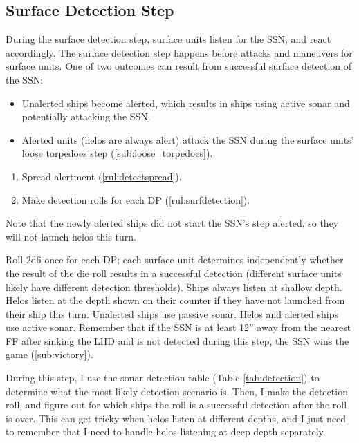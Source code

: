 \documentclass[../TacSubMicroRules.tex]{subfiles}
\begin{document}
\subsection{Surface Detection Step}%
\label{sub:surface_detection_step}

During the surface detection step, surface units listen for the SSN, and react accordingly.
The surface detection step happens before attacks and maneuvers for surface units.
One of two outcomes can result from successful surface detection of the SSN:
\begin{itemize}
    \item Unalerted ships become alerted, which results in ships using active sonar and potentially attacking the SSN.
    \item Alerted units (helos are always alert) attack the SSN during the surface units' loose torpedoes step (\ref{sub:loose_torpedoes}).
\end{itemize}
\begin{enumerate}
    \item Spread alertment (\ref{rul:detectspread}).
    \item Make detection rolls for each DP (\ref{rul:surfdetection}).
\end{enumerate}

 
Note that the newly alerted ships did not start the SSN's step alerted, so they will not launch helos this turn.

 
Roll 2d6 once for each DP; each surface unit determines independently whether the result of the die roll results in a successful detection (different surface units likely have different detection thresholds).
Ships always listen at shallow depth.
Helos listen at the depth shown on their counter if they have not launched from their ship this turn.
Unalerted ships use passive sonar.
Helos and alerted ships use active sonar.
Remember that if the SSN is at least 12'' away from the nearest FF after sinking the LHD and is not detected during this step, the SSN wins the game (\ref{sub:victory}).

\begin{design}
    During this step, I use the sonar detection table (Table \ref{tab:detection}) to determine what the most likely detection scenario is.
    Then, I make the detection roll, and figure out for which ships the roll is a successful detection after the roll is over.
    This can get tricky when helos listen at different depths, and I just need to remember that I need to handle helos listening at deep depth separately.
\end{design}
\end{document}
